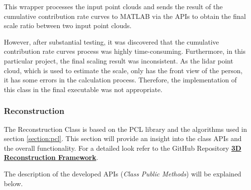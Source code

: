 \documentclass[12pt]{report}
\begin{document}
This wrapper processes the input point clouds and sends the result of the cumulative contribution rate curves to MATLAB via the APIs to obtain the final scale ratio between two input point clouds.

However, after substantial testing, it was discovered that the cumulative contribution rate curves process was highly time-consuming. 
Furthermore, in this particular project, the final scaling result was inconsistent. 
As the lidar point cloud, which is used to estimate the scale, only has the front view of the person, it has some errors in the calculation process. 
Therefore, the implementation of this class in the final executable was not appropriate.




\subsubsection{Reconstruction}
The Reconstruction Class is based on the PCL library and the algorithms used in section \ref{section:pcl}.
This section will provide an insight into the class APIs and the overall functionality. For a detailed look refer to the GitHub Repository \textbf{\href{https://github.com/esteban-andrade/3D-Reconstructrion-Scanner} {3D Reconstruction Framework}}.

The description of the developed APIs (\textit{Class Public Methods}) will be explained below.
\end{document}
